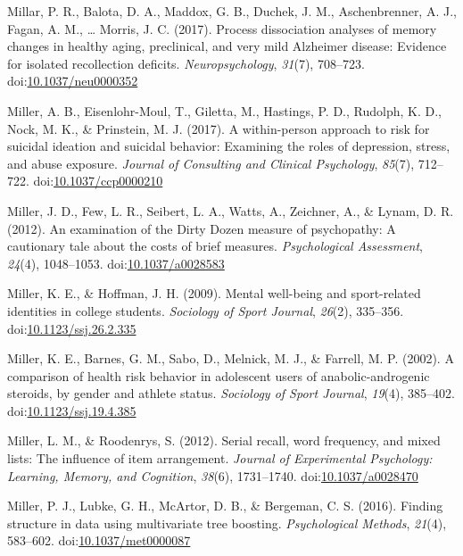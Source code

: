 \documentclass[english,man]{apa6}
\theoremstyle{definition}
\theoremstyle{definition}
\theoremstyle{definition}
\theoremstyle{remark}
\begin{document}
\hypertarget{ref-Millar2017}{}
Millar, P. R., Balota, D. A., Maddox, G. B., Duchek, J. M.,
Aschenbrenner, A. J., Fagan, A. M., \ldots{} Morris, J. C. (2017).
Process dissociation analyses of memory changes in healthy aging,
preclinical, and very mild Alzheimer disease: Evidence for isolated
recollection deficits. \emph{Neuropsychology}, \emph{31}(7), 708--723.
doi:\href{https://doi.org/10.1037/neu0000352}{10.1037/neu0000352}

\hypertarget{ref-Miller2017}{}
Miller, A. B., Eisenlohr-Moul, T., Giletta, M., Hastings, P. D.,
Rudolph, K. D., Nock, M. K., \& Prinstein, M. J. (2017). A within-person
approach to risk for suicidal ideation and suicidal behavior: Examining
the roles of depression, stress, and abuse exposure. \emph{Journal of
Consulting and Clinical Psychology}, \emph{85}(7), 712--722.
doi:\href{https://doi.org/10.1037/ccp0000210}{10.1037/ccp0000210}

\hypertarget{ref-Miller2012a}{}
Miller, J. D., Few, L. R., Seibert, L. A., Watts, A., Zeichner, A., \&
Lynam, D. R. (2012). An examination of the Dirty Dozen measure of
psychopathy: A cautionary tale about the costs of brief measures.
\emph{Psychological Assessment}, \emph{24}(4), 1048--1053.
doi:\href{https://doi.org/10.1037/a0028583}{10.1037/a0028583}

\hypertarget{ref-Miller2009}{}
Miller, K. E., \& Hoffman, J. H. (2009). Mental well-being and
sport-related identities in college students. \emph{Sociology of Sport
Journal}, \emph{26}(2), 335--356.
doi:\href{https://doi.org/10.1123/ssj.26.2.335}{10.1123/ssj.26.2.335}

\hypertarget{ref-Miller2002}{}
Miller, K. E., Barnes, G. M., Sabo, D., Melnick, M. J., \& Farrell, M.
P. (2002). A comparison of health risk behavior in adolescent users of
anabolic-androgenic steroids, by gender and athlete status.
\emph{Sociology of Sport Journal}, \emph{19}(4), 385--402.
doi:\href{https://doi.org/10.1123/ssj.19.4.385}{10.1123/ssj.19.4.385}

\hypertarget{ref-Miller2012}{}
Miller, L. M., \& Roodenrys, S. (2012). Serial recall, word frequency,
and mixed lists: The influence of item arrangement. \emph{Journal of
Experimental Psychology: Learning, Memory, and Cognition}, \emph{38}(6),
1731--1740.
doi:\href{https://doi.org/10.1037/a0028470}{10.1037/a0028470}

\hypertarget{ref-Miller2016}{}
Miller, P. J., Lubke, G. H., McArtor, D. B., \& Bergeman, C. S. (2016).
Finding structure in data using multivariate tree boosting.
\emph{Psychological Methods}, \emph{21}(4), 583--602.
doi:\href{https://doi.org/10.1037/met0000087}{10.1037/met0000087}
\end{document}
